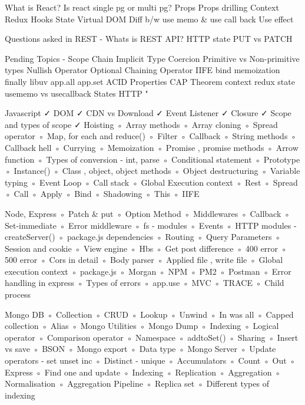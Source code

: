 What is React?
Is react single pg or multi pg?
Props
Props drilling
Context
Redux
Hooks
State
Virtual DOM
Diff b/w use memo & use call back
Use effect

Questions asked in REST -
Whats is REST API?
HTTP state
PUT vs PATCH

Pending Topics -
Scope Chain
Implicit Type Coercion
Primitive vs Non-primitive types
Nullish Operator
Optional Chaining Operator
IIFE
bind
memoization
finally
libuv
app.all
app.set
ACID Properties
CAP Theorem
context
redux
state
usememo vs usecallback
States HTTP
"

Javascript
 ✓ DOM
 ✓ CDN vs Download
 ✓ Event Listener
 ✓ Closure
 ✓ Scope and types of scope
 ✓ Hoisting
 ◦ Array methods
 ◦ Array cloning
 ◦ Spread operator
 ◦ Map, for each and reduce()
 ◦ Filter 
 ◦ Callback
 ◦ String methods
 ◦ Callback hell
 ◦ Currying
 ◦ Memoization
 ◦ Promise , promise methods
 ◦ Arrow function
 ◦ Types of conversion - int, parse
 ◦ Conditional statement
 ◦ Prototype
 ◦ Instance()
 ◦ Class , object, object methods
 ◦ Object destructuring
 ◦ Variable typing
 ◦ Event Loop
 ◦ Call stack
 ◦ Global Execution context
 ◦ Rest 
 ◦ Spread 
 ◦ Call 
 ◦ Apply 
 ◦ Bind
 ◦ Shadowing
 ◦ This
 ◦ IIFE

Node, Express
 ◦ Patch & put
 ◦ Option Method
 ◦ Middlewares
 ◦ Callback
 ◦ Set-immediate
 ◦ Error middleware
 ◦ fs - modules
 ◦ Events
 ◦ HTTP modules - createServer()
 ◦ package.js dependencies
 ◦ Routing
 ◦ Query Parameters
 ◦ Session and cookie
 ◦ View engine
 ◦ Hbs
 ◦ Get post difference
 ◦ 400 error
 ◦ 500 error
 ◦ Cors in detail
 ◦ Body parser
 ◦ Applied file , write file
 ◦ Global execution context
 ◦ package.js
 ◦ Morgan
 ◦ NPM
 ◦ PM2
 ◦ Postman
 ◦ Error handling in express
 ◦ Types of errors
 ◦ app.use
 ◦ MVC
 ◦ TRACE
 ◦ Child process

Mongo DB
 ◦ Collection
 ◦ CRUD
 ◦ Lookup
 ◦ Unwind
 ◦ In was all
 ◦ Capped collection
 ◦ Alias
 ◦ Mongo Utilities
 ◦ Mongo Dump
 ◦ Indexing
 ◦ Logical operator
 ◦ Comparison operator
 ◦ Namespace
 ◦ addtoSet()
 ◦ Sharing
 ◦ Insert vs save
 ◦ BSON
 ◦ Mongo export
 ◦ Data type
 ◦ Mongo Server
 ◦ Update operators - set unset inc
 ◦ Distinct - unique
 ◦ Accumulators
 ◦ Count
 ◦ Out
 ◦ Express
 ◦ Find one and update
 ◦ Indexing
 ◦ Replication
 ◦ Aggregation
 ◦ Normalisation
 ◦ Aggregation Pipeline
 ◦ Replica set
 ◦ Different types of indexing


